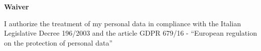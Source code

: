 \documentclass[10pt]{article}
\begin{document}

\vfill
{\centering \textbf{Waiver} \par}
{\small I authorize the treatment of my personal data in compliance with the Italian Legislative Decree 196/2003 and the article GDPR 679/16 - “European regulation on the protection of personal data”}
\end{document}
